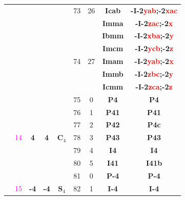 \documentclass{article}      %
\begin{document}
\begin{small}
\begin{longtable}[c]{|c|c|c|c|c|c|c|c|c|}
	  &  & & & &\textrm{73}  &\textrm{26} &\textbf{Icab}         &\textbf{-I-2\textcolor{red}{yab};-2\textcolor{red}{xac}}\\\cline{6-9}     
          &  & & & &  & &\textbf{Imma}         &\textbf{-I-2\textcolor{red}{zac};-2\textcolor{red}{x}}\\\cline{8-9}       
          &  & & & &  & &\textbf{Ibmm}         &\textbf{-I-2\textcolor{red}{xba};-2\textcolor{red}{y}}\\\cline{8-9}       
          &  & & & &  & &\textbf{Imcm}         &\textbf{-I-2\textcolor{red}{ycb};-2\textcolor{red}{z}}\\\cline{8-9}       
	  &  & & & &\textrm{74}  &\textrm{27} &\textbf{Imam}         &\textbf{-I-2\textcolor{red}{yab};-2\textcolor{red}{x}}\\\cline{8-9}       
          &  & & & &  & &\textbf{Immb}         &\textbf{-I-2\textcolor{red}{zbc};-2\textcolor{red}{y}}\\\cline{8-9}     
          &  & & & &  & &\textbf{Icmm}         &\textbf{-I-2\textcolor{red}{zca};-2\textcolor{red}{z}}\\\hline       
          & & & & &\textrm{75} &\textrm{0} &\textbf{P4}         &\textbf{P4}\\\cline{6-9}              
          & & & & &\textrm{76} &\textrm{1} &\textbf{P41}         &\textbf{P41}\\\cline{6-9}            
          & & & & &\textrm{77} &\textrm{2} &\textbf{P42}         &\textbf{P4c}\\\cline{6-9}            
	  & \textrm{\textcolor{magenta}{14}} &\textbf{4} &\textbf{4} &$\mathbf{C}_4$ &\textrm{78} &\textrm{3} &\textbf{P43}         &\textbf{P43}\\\cline{6-9}            
          & & & & &\textrm{79} &\textrm{4} &\textbf{I4}         &\textbf{I4}\\\cline{6-9}              
          & & & & &\textrm{80} &\textrm{5} &\textbf{I41}         &\textbf{I41b}\\\cline{2-9}           
          & & & & &\textrm{81} &\textrm{0} &\textbf{P-4}         &\textbf{P-4}\\\cline{6-9}            
	  & \textrm{\textcolor{magenta}{15}} &\textbf{-4} &\textbf{-4} &$\mathbf{S}_4$ &\textrm{82} &\textrm{1} &\textbf{I-4}   &\textbf{I-4}\\\cline{2-9}  

\end{longtable}
\end{small}
\end{document}
